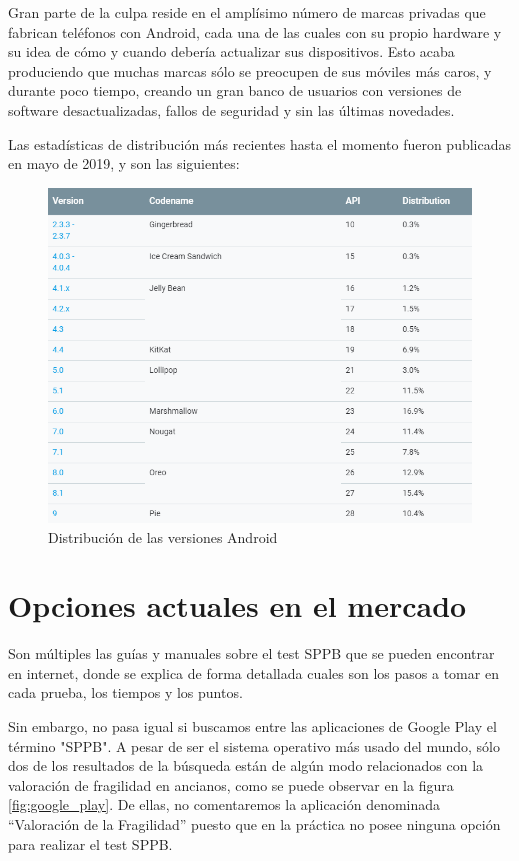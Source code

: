 Gran parte de la culpa reside en el amplísimo número de marcas privadas que fabrican teléfonos con Android, cada una de las cuales con su propio hardware y su idea de cómo y cuando debería actualizar sus dispositivos. Esto acaba produciendo que muchas marcas sólo se preocupen de sus móviles más caros, y durante poco tiempo, creando un gran banco de usuarios con versiones de software desactualizadas, fallos de seguridad y sin las últimas novedades. 

Las estadísticas de distribución más recientes hasta el momento fueron publicadas en mayo de 2019, y son las siguientes:
\begin{figure}[H]
	\centering
	\includegraphics[scale=0.65]{imagenes/distribucion.png}
	\caption{Distribución de las versiones Android\cite{dashboards}\label{fig:distribucion}}
\end{figure}


\section{Opciones actuales en el mercado}

Son múltiples las guías y manuales sobre el test SPPB que se pueden encontrar en internet, donde se explica de forma detallada cuales son los pasos a tomar en cada prueba, los tiempos y los puntos. 

Sin embargo, no pasa igual si buscamos entre las aplicaciones de Google Play el término "SPPB". A pesar de ser el sistema operativo más usado del mundo, sólo dos de los resultados de la búsqueda están de algún modo relacionados con la valoración de fragilidad en ancianos, como se puede observar en la figura \ref{fig:google_play}. De ellas, no comentaremos la aplicación denominada ``Valoración de la Fragilidad''\cite{BlueBliss} puesto que en la práctica no posee ninguna opción para realizar el test SPPB.

